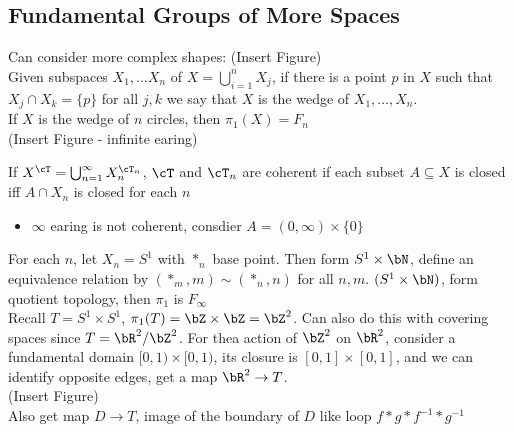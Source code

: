 
\subsection{Fundamental Groups of More Spaces} 

Can consider more complex shapes: (Insert Figure) \\

\noindent
Given subspaces $X_1, \ldots X_n$ of $X= \bigcup_{i=1}^n X_j$, if there is a point $p$ in $X$ such that $X_j \cap X_k = \{p\}$ for all $j,k$ we say that $X$ is the wedge of $X_1, \ldots, X_n$. \\ 
If $X$ is the wedge of $n$ circles, then $\pi_1(X) = F_n$ \\

(Insert Figure - infinite earing)

\noindent
If $X^{\cT} = \bigcup_{n=1}^{\infty} X_n^{\cT_n}$, $\cT$ and $\cT_n$ are coherent if each subset $A \subseteq X$ is closed iff $A \cap X_n$ is closed for each $n$ 
\begin{itemize}
    \item $\infty$ earing is not coherent, consdier $A = (0, \infty) \times \{0\}$ 
\end{itemize}
For each $n$, let $X_n = S^1$ with $*_n$ base point. Then form $S^1 \times \bN$, define an equivalence relation by $(*_m, m) \sim (*_n, n)$ for all $n,m$. $(S^1 \times \bN)$, form quotient topology, then $\pi_1$ is $F_{\infty}$\\

\noindent
Recall $T = S^1 \times S^1$, $\pi_1(T) = \bZ \times \bZ = \bZ^2$. Can also do this with covering spaces since $T = \bR^2/\bZ^2$. For thea action of $\bZ^2$ on $\bR^2$, consider a fundamental domain $[0,1) \times [0,1)$, its closure is $[0,1] \times [0,1]$, and we can identify opposite edges, get a map $\bR^2 \to T$. \\
(Insert Figure) \\ 
Also get map $D \to T$, image of the boundary of $D$ like loop $f*g*f^{-1}*g^{-1}$ 